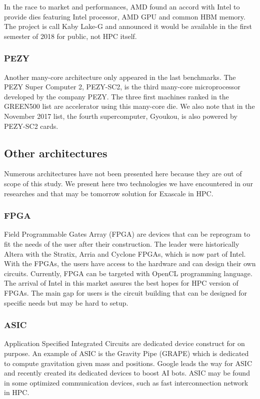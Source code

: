 In the race to market and performances, AMD found an accord with Intel to provide dies featuring Intel processor, AMD GPU and common HBM memory. 
The project is call Kaby Lake-G and announced it would be available in the first semester of 2018 for public, not HPC itself. 

\subsubsection{PEZY}
Another many-core architecture only appeared in the last benchmarks. 
The PEZY Super Computer 2, PEZY-SC2, is the third many-core microprocessor developed by the company PEZY. 
The three first machines ranked in the GREEN500 list are accelerator using this many-core die. 
We also note that in the November 2017 list, the fourth supercomputer, Gyoukou, is also powered by PEZY-SC2 cards.

\subsection{Other architectures}
Numerous architectures have not been presented here because they are out of scope of this study. 
We present here two technologies we have encountered in our researches and that may be tomorrow solution for Exascale in HPC. 
\subsubsection{FPGA}
Field Programmable Gates Array (FPGA) are devices that can be reprogram to fit the needs of the user after their construction.
The leader were historically Altera with the Stratix, Arria and Cyclone FPGAs, which is now part of Intel. 
With the FPGAs, the users have access to the hardware and can design their own circuits. 
Currently, FPGA can be targeted with OpenCL programming language. 
The arrival of Intel in this market assures the best hopes for HPC version of FPGAs. 
The main gap for users is the circuit building that can be designed for specific needs but may be hard to setup. 
\subsubsection{ASIC}
Application Specified Integrated Circuits are dedicated device construct for on purpose. 
An example of ASIC is the Gravity Pipe (GRAPE) which is dedicated to compute gravitation given mass and positions.
Google leads the way for ASIC and recently created its dedicated devices to boost AI bots.
ASIC may be found in some optimized communication devices, such as fast interconnection network in HPC.  

